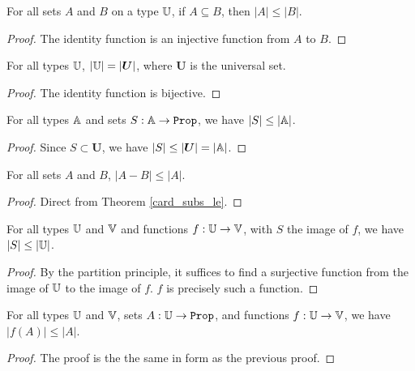 \documentclass[../../math.tex]{subfiles}
\begin{document}
\begin{theorem} \label{card_subs_le}
    For all sets $A$ and $B$ on a type $\mathbb{U}$, if $A \subseteq B$, then $|A| \leq
    |B|$.
\end{theorem}
\begin{proof}
    The identity function is an injective function from $A$ to $B$.
\end{proof}

\begin{theorem} \label{card_all}
    For all types $\mathbb{U}$, $|\mathbb{U}| = |\bm U|$, where $\bm U$ is the universal set.
\end{theorem}
\begin{proof}
    The identity function is bijective.
\end{proof}

\begin{theorem} \label{card_sub_le}
    For all types $\mathbb{A}$ and sets $S : \A \to \Prop$, we have $|S| \leq |\mathbb{A}|$.
\end{theorem}
\begin{proof}
    Since $S \subset \bm U$, we have $|S| \leq |\bm U| = |\mathbb{A}|$.
\end{proof}

\begin{theorem} \label{card_minus_le}
    For all sets $A$ and $B$, $|A - B| \leq |A|$.
\end{theorem}
\begin{proof}
    Direct from Theorem \ref{card_subs_le}.
\end{proof}

\begin{theorem} \label{image_le}
    For all types $\mathbb{U}$ and $\mathbb{V}$ and functions $f : \mathbb{U} \to \mathbb{V}$, with $S$ the
    image of $f$, we have $|S| \leq |\mathbb{U}|$.
\end{theorem}
\begin{proof}
    By the partition principle, it suffices to find a surjective function from
    the image of $\mathbb{U}$ to the image of $f$.  $f$ is precisely such a function.
\end{proof}

\begin{theorem} \label{image_under_le}
    For all types $\mathbb{U}$ and $\mathbb{V}$, sets $A : \U \to \Prop$, and functions $f : \mathbb{U}
    \to \mathbb{V}$, we have $|f(A)| \leq |A|$.
\end{theorem}
\begin{proof}
    The proof is the the same in form as the previous proof.
\end{proof}
\end{document}
